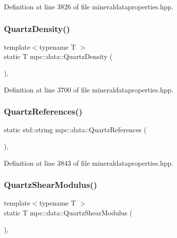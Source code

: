 Definition at line 3826 of file mineraldataproperties.\+hpp.

\mbox{\label{namespacempc_1_1data_a80e2080ccffe158fef6e94f1aa08f469}} 
\subsubsection{\texorpdfstring{Quartz\+Density()}{QuartzDensity()}}
{\footnotesize\ttfamily template$<$typename T $>$ \\
static T mpc\+::data\+::\+Quartz\+Density (\begin{DoxyParamCaption}{ }\end{DoxyParamCaption})\hspace{0.3cm}{\ttfamily [inline]}, {\ttfamily [static]}}



Definition at line 3700 of file mineraldataproperties.\+hpp.

\mbox{\label{namespacempc_1_1data_a8d145e0915845b9e70302411fff6ce84}} 
\subsubsection{\texorpdfstring{Quartz\+References()}{QuartzReferences()}}
{\footnotesize\ttfamily static std\+::string mpc\+::data\+::\+Quartz\+References (\begin{DoxyParamCaption}{ }\end{DoxyParamCaption})\hspace{0.3cm}{\ttfamily [inline]}, {\ttfamily [static]}}



Definition at line 3843 of file mineraldataproperties.\+hpp.

\mbox{\label{namespacempc_1_1data_af3524f0e5dccaef40b384a3668ba5f90}} 
\subsubsection{\texorpdfstring{Quartz\+Shear\+Modulus()}{QuartzShearModulus()}}
{\footnotesize\ttfamily template$<$typename T $>$ \\
static T mpc\+::data\+::\+Quartz\+Shear\+Modulus (\begin{DoxyParamCaption}{ }\end{DoxyParamCaption})\hspace{0.3cm}{\ttfamily [inline]}, {\ttfamily [static]}}



